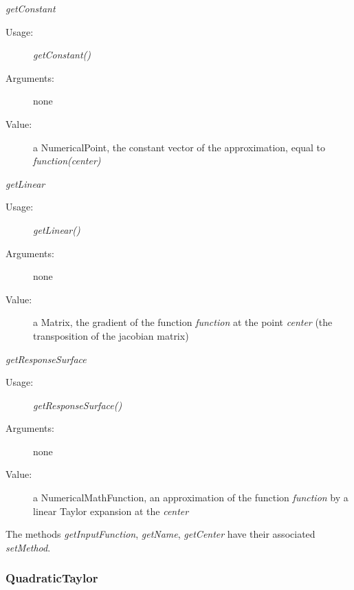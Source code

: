 \begin{description}
\begin{description}
\item \textit{getConstant}
\begin{description}
\item[Usage:] \textit{getConstant()}
\item[Arguments:] none
\item[Value:] a NumericalPoint, the constant vector of the approximation, equal to \textit{function(center)}
\end{description}
\bigskip

\item \textit{getLinear}
\begin{description}
\item[Usage:] \textit{getLinear()}
\item[Arguments:] none
\item[Value:] a Matrix, the gradient of the function \textit{function} at the point \textit{center} (the transposition of the jacobian matrix)
\end{description}
\bigskip


\item \textit{getResponseSurface}
\begin{description}
\item[Usage:] \textit{getResponseSurface()} %
\item[Arguments:] none
\item[Value:] a NumericalMathFunction, an approximation of the function \textit{function} by a linear Taylor expansion at the \textit{center}
\end{description}
\bigskip

\end{description}

\item[Links:] \rule{0pt}{1em}
\end{description}

The methods \textit{getInputFunction}, \textit{getName}, \textit{getCenter} have their associated \textit{setMethod}.



\newpage
\subsubsection{QuadraticTaylor}

